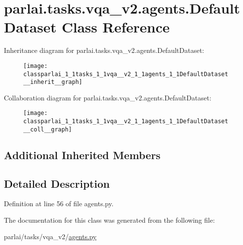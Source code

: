 \hypertarget{classparlai_1_1tasks_1_1vqa__v2_1_1agents_1_1DefaultDataset}{}\section{parlai.\+tasks.\+vqa\+\_\+v2.\+agents.\+Default\+Dataset Class Reference}
\label{classparlai_1_1tasks_1_1vqa__v2_1_1agents_1_1DefaultDataset}


Inheritance diagram for parlai.\+tasks.\+vqa\+\_\+v2.\+agents.\+Default\+Dataset\+:
\nopagebreak
\begin{figure}[H]
\begin{center}
\leavevmode
\texttt{[image: classparlai\_1\_1tasks\_1\_1vqa\_\_v2\_1\_1agents\_1\_1DefaultDataset\_\_inherit\_\_graph]}
\end{center}
\end{figure}


Collaboration diagram for parlai.\+tasks.\+vqa\+\_\+v2.\+agents.\+Default\+Dataset\+:
\nopagebreak
\begin{figure}[H]
\begin{center}
\leavevmode
\texttt{[image: classparlai\_1\_1tasks\_1\_1vqa\_\_v2\_1\_1agents\_1\_1DefaultDataset\_\_coll\_\_graph]}
\end{center}
\end{figure}
\subsection*{Additional Inherited Members}


\subsection{Detailed Description}


Definition at line 56 of file agents.\+py.



The documentation for this class was generated from the following file\+:\begin{DoxyCompactItemize}
\item 
parlai/tasks/vqa\+\_\+v2/\hyperlink{parlai_2tasks_2vqa__v2_2agents_8py}{agents.\+py}\end{DoxyCompactItemize}
